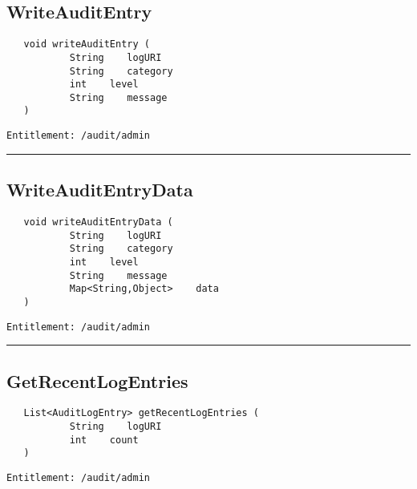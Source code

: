\subsection{WriteAuditEntry}
\label{Api:WriteAuditEntry}
\begin{verbatim}
   void writeAuditEntry (
           String    logURI
           String    category
           int    level
           String    message
   )
\end{verbatim}
\begin{Verbatim}[fontsize=\small, formatcom=\color{Maroon}]
  Entitlement: /audit/admin
\end{Verbatim}



\rule{12cm}{2pt}
\subsection{WriteAuditEntryData}
\label{Api:WriteAuditEntryData}
\begin{verbatim}
   void writeAuditEntryData (
           String    logURI
           String    category
           int    level
           String    message
           Map<String,Object>    data
   )
\end{verbatim}
\begin{Verbatim}[fontsize=\small, formatcom=\color{Maroon}]
  Entitlement: /audit/admin
\end{Verbatim}



\rule{12cm}{2pt}
\subsection{GetRecentLogEntries}
\label{Api:GetRecentLogEntries}
\begin{verbatim}
   List<AuditLogEntry> getRecentLogEntries (
           String    logURI
           int    count
   )
\end{verbatim}
\begin{Verbatim}[fontsize=\small, formatcom=\color{Maroon}]
  Entitlement: /audit/admin
\end{Verbatim}



